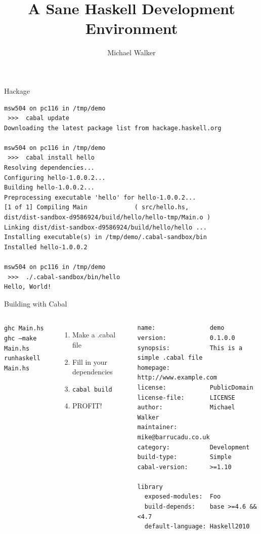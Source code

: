 \documentclass[20pt]{beamer}
\author{Michael Walker}
\title{A Sane Haskell Development Environment}
\institute{York Haskell\\
  \texttt{mike@barrucadu.co.uk}
}
\date{}
\begin{document}
\begin{frame}[plain]
  \titlepage
\end{frame}

\begin{frame}[fragile]{Hackage}
  \begin{verbatim}
msw504 on pc116 in /tmp/demo 
 >>>  cabal update
Downloading the latest package list from hackage.haskell.org

msw504 on pc116 in /tmp/demo 
 >>>  cabal install hello
Resolving dependencies...
Configuring hello-1.0.0.2...
Building hello-1.0.0.2...
Preprocessing executable 'hello' for hello-1.0.0.2...
[1 of 1] Compiling Main             ( src/hello.hs,
dist/dist-sandbox-d9586924/build/hello/hello-tmp/Main.o )
Linking dist/dist-sandbox-d9586924/build/hello/hello ...
Installing executable(s) in /tmp/demo/.cabal-sandbox/bin
Installed hello-1.0.0.2

msw504 on pc116 in /tmp/demo 
 >>>  ./.cabal-sandbox/bin/hello 
Hello, World!
  \end{verbatim}
\end{frame}

\begin{frame}[fragile]{Building with Cabal}
  \begin{columns}

  \texttt{ghc Main.hs}\\\texttt{ghc --make Main.hs}\\\texttt{runhaskell Main.hs}

  \vspace{3cm}

  \begin{enumerate}
  \item Make a .cabal file
  \item Fill in your dependencies
  \item \texttt{cabal build}
  \item PROFIT!
  \end{enumerate}

  \vspace{3.5cm}

  \begin{verbatim}
name:               demo
version:            0.1.0.0
synopsis:           This is a simple .cabal file
homepage:           http://www.example.com
license:            PublicDomain
license-file:       LICENSE
author:             Michael Walker
maintainer:         mike@barrucadu.co.uk
category:           Development
build-type:         Simple
cabal-version:      >=1.10

library
  exposed-modules:  Foo
  build-depends:    base >=4.6 && <4.7
  default-language: Haskell2010
  \end{verbatim}
  \end{columns}
\end{frame}
\end{document}
